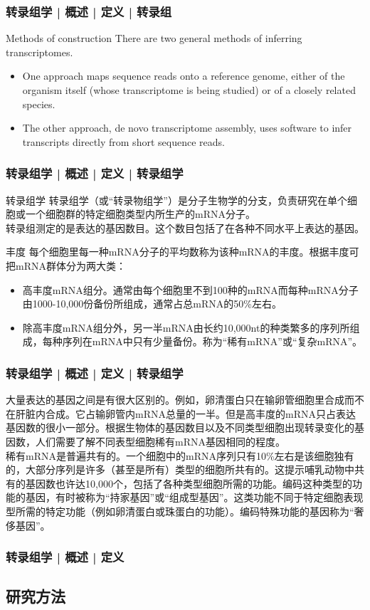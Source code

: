 \begin{frame}
  \frametitle{转录组学 | 概述 | 定义 | 转录组}
  \begin{block}{Methods of construction}
    There are two general methods of inferring transcriptomes.
    \begin{itemize}
      \item One approach maps sequence reads onto a reference genome, either of the organism itself (whose transcriptome is being studied) or of a closely related species.
      \item The other approach, de novo transcriptome assembly, uses software to infer transcripts directly from short sequence reads.
    \end{itemize}
  \end{block}
\end{frame}

\begin{frame}
  \frametitle{转录组学 | 概述 | 定义 | 转录组学}
  \begin{block}{转录组学}
    转录组学（或“转录物组学”）是分子生物学的分支，负责研究在单个细胞或一个细胞群的特定细胞类型内所生产的mRNA分子。\\
    \vspace{1em}
转录组测定的是表达的基因数目。这个数目包括了在各种不同水平上表达的基因。\\
\end{block}
\begin{block}{丰度}
每个细胞里每一种mRNA分子的平均数称为该种mRNA的丰度。根据丰度可把mRNA群体分为两大类：
\begin{itemize}
  \item 高丰度mRNA组分。通常由每个细胞里不到100种的mRNA而每种mRNA分子由1000-10,000份备份所组成，通常占总mRNA的50\%左右。
  \item 除高丰度mRNA组分外，另一半mRNA由长约10,000nt的种类繁多的序列所组成，每种序列在mRNA中只有少量备份。称为“稀有mRNA”或“复杂mRNA”。
\end{itemize}
  \end{block}
\end{frame}

\begin{frame}
  \frametitle{转录组学 | 概述 | 定义 | 转录组学}
大量表达的基因之间是有很大区别的。例如，卵清蛋白只在输卵管细胞里合成而不在肝脏内合成。它占输卵管内mRNA总量的一半。但是高丰度的mRNA只占表达基因数的很小一部分。根据生物体的基因数目以及不同类型细胞出现转录变化的基因数，人们需要了解不同表型细胞稀有mRNA基因相同的程度。\\
\vspace{1em}
稀有mRNA是普遍共有的。一个细胞中的mRNA序列只有10\%左右是该细胞独有的，大部分序列是许多（甚至是所有）类型的细胞所共有的。这提示哺乳动物中共有的基因数也许达10,000个，包括了各种类型细胞所需的功能。编码这种类型的功能的基因，有时被称为“持家基因”或“组成型基因”。这类功能不同于特定细胞表现型所需的特定功能（例如卵清蛋白或珠蛋白的功能）。编码特殊功能的基因称为“奢侈基因”。
\end{frame}

\begin{frame}[label=current]
  \frametitle{转录组学 | 概述 | 定义}
\end{frame}

\subsection{研究方法}

